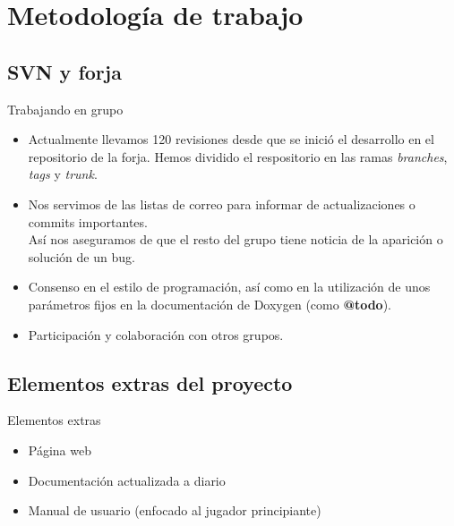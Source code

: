 \documentclass[9pt,xcolor=svgnames]{beamer}
\begin{document}
  
 \section{Metodología de trabajo}
 
  \subsection{SVN y forja}

  \begin{frame}{Trabajando en grupo}
   
   \begin{itemize}
    \item Actualmente llevamos 120 revisiones desde que se inició
	  el desarrollo en el repositorio de la forja. Hemos dividido
          el respositorio en las ramas \textit{branches}, \textit{tags}
          y \textit{trunk}.
	  \vspace*{0.3cm}

    \item Nos servimos de las listas de correo para informar de
	  actualizaciones o commits importantes.\\
	  Así nos aseguramos de que el resto del grupo tiene noticia de
	  la aparición o solución de un bug.\\
	  \vspace*{0.3cm}
	  
    \item Consenso en el estilo de programación, así como en la
	  utilización de unos parámetros fijos en la documentación de
	  Doxygen (como \textbf{@todo}).\\
	  \vspace*{0.3cm}

    \item Participación y colaboración con otros grupos.
   \end{itemize}
  \end{frame}
  
  
  \subsection{Elementos extras del proyecto}
  
  \begin{frame}{Elementos extras}
   \begin{itemize}
    \item Página web
    \item Documentación actualizada a diario
    \item Manual de usuario (enfocado al jugador principiante)
   \end{itemize}
  \end{frame}
\end{document}
